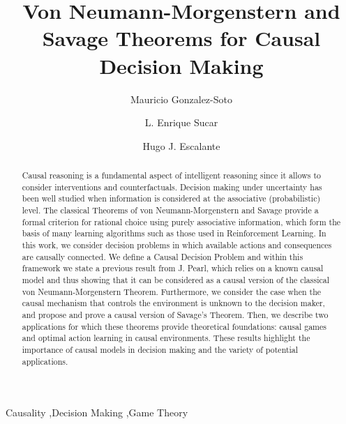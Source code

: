 \documentclass[review]{elsarticle}
\begin{document}
\begin{frontmatter}

\title{Von Neumann-Morgenstern and Savage Theorems for Causal Decision Making}


\author[1]{Mauricio Gonzalez-Soto}

\author[1]{L. Enrique Sucar}

\author[1]{Hugo J. Escalante}

\address[1]{Coordinaci\'on de Ciencias Computacionales, Instituto Nacional de Astrof\'isica \'Optica y Electr\'onica ,Luis Enrique Erro 1, Santa Maria Tonanzintla, M\'exico.}

\begin{abstract}
Causal reasoning is a fundamental aspect of intelligent reasoning since it allows to consider interventions and counterfactuals. Decision making under uncertainty has been well studied when information is considered at the associative (probabilistic) level. The classical Theorems of von Neumann-Morgenstern and Savage provide a formal criterion for rational choice using purely associative information, which form the basis of many learning algorithms such as those used in Reinforcement Learning. In this work, we consider decision problems in which available actions and consequences are causally connected. We define a Causal Decision Problem and within this framework we state a previous result from J. Pearl, which relies on a known causal model and thus showing that it can be considered as a causal version of the classical von Neumann-Morgenstern Theorem. Furthermore, we consider the case when the causal mechanism that controls the environment is unknown to the decision maker, and propose and prove a causal version of Savage's Theorem. Then, we describe two applications for which these theorems provide theoretical foundations: causal games and optimal action learning in causal environments. These results highlight the importance of causal models in decision making and the variety of potential applications.
\end{abstract}

\begin{keyword}
Causality \sep Decision Making \sep Game Theory
\end{keyword}

\end{frontmatter}

\linenumbers

\end{document}
